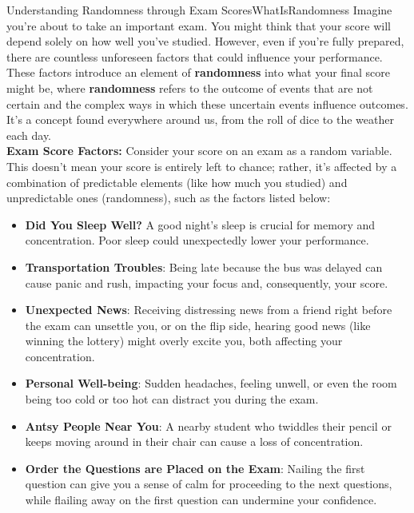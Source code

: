 \begin{funColor}{Understanding Randomness through Exam Scores}{WhatIsRandomness}
Imagine you're about to take an important exam. You might think that your score will depend solely on how well you've studied. However, even if you're fully prepared, there are countless unforeseen factors that could influence your performance. These factors introduce an element of \textbf{randomness} into what your final score might be, where \textbf{randomness} refers to the outcome of events that are not certain and the complex ways in which these uncertain events influence outcomes. It's a concept found everywhere around us, from the roll of dice to the weather each day.\\

\textbf{Exam Score Factors:} Consider your score on an exam as a random variable. This doesn't mean your score is entirely left to chance; rather, it's affected by a combination of predictable elements (like how much you studied) and unpredictable ones (randomness), such as the factors listed below:

\begin{itemize}
  \item \textbf{Did You Sleep Well?} A good night's sleep is crucial for memory and concentration. Poor sleep could unexpectedly lower your performance.
  
  \item \textbf{Transportation Troubles}: Being late because the bus was delayed can cause panic and rush, impacting your focus and, consequently, your score.
  
  \item \textbf{Unexpected News}: Receiving distressing news from a friend right before the exam can unsettle you, or on the flip side, hearing good news (like winning the lottery) might overly excite you, both affecting your concentration.
  
  \item \textbf{Personal Well-being}: Sudden headaches, feeling unwell, or even the room being too cold or too hot can distract you during the exam.

   \item \textbf{Antsy People Near You}: A nearby student who twiddles their pencil or keeps moving around in their chair can cause a loss of concentration. 

   \item \textbf{Order the Questions are Placed on the Exam}: Nailing the first question can give you a sense of calm for proceeding to the next questions, while flailing away on the first question can undermine your confidence.


\end{itemize}
\end{funColor}
